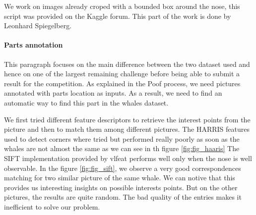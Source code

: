 \documentclass[twoside]{article}
\begin{document}
\begin{multicols}{2}
We work on images already croped with a bounded box around the nose, this script was provided on the Kaggle forum. This part of the work is done by Leonhard Spiegelberg.

\paragraph{Parts annotation}

This paragraph focuses on the main difference between the two dataset used and hence on one of the largest remaining challenge before being able to submit a result for the competition. As explained in the Poof process, we need pictures annotated with parts location as inputs. As a result, we need to find an automatic way to find this part in the whales dataset.

We first tried different feature descriptors to retrieve the interest points from the picture and then to match them among different pictures. The HARRIS features used to detect corners where tried but performed really poorly as soon as the whales are not almost the same as we can see in th figure \ref{fig:fig_haaris} The SIFT implementation provided by vlfeat \cite{vlf} performs well only when the nose is well observable. In the figure \ref{fig:fig_sift}, we observe a very good correspondences matching for two similar picture of the same whale. We can notive that this provides us interesting insights on possible interests points. But on the other pictures, the results are quite random. The bad quality of the entries makes it inefficient to solve our problem.



\end{multicols}
\end{document}
